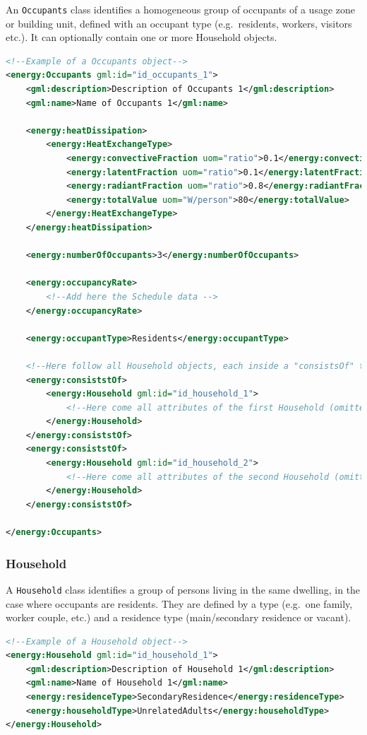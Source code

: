 \documentclass[a4paper,12pt]{article}
\begin{document}
An \lstinline!Occupants! class identifies a homogeneous group of
occupants of a usage zone or building unit, defined with an occupant
type (e.g.~residents, workers, visitors etc.). It can optionally contain
one or more Household objects.

\begin{lstlisting}[language=XML]
<!--Example of a Occupants object-->
<energy:Occupants gml:id="id_occupants_1">
    <gml:description>Description of Occupants 1</gml:description>
    <gml:name>Name of Occupants 1</gml:name>

    <energy:heatDissipation>
        <energy:HeatExchangeType>
            <energy:convectiveFraction uom="ratio">0.1</energy:convectiveFraction>
            <energy:latentFraction uom="ratio">0.1</energy:latentFraction>
            <energy:radiantFraction uom="ratio">0.8</energy:radiantFraction>
            <energy:totalValue uom="W/person">80</energy:totalValue>
        </energy:HeatExchangeType>
    </energy:heatDissipation>

    <energy:numberOfOccupants>3</energy:numberOfOccupants>

    <energy:occupancyRate>
        <!--Add here the Schedule data -->
    </energy:occupancyRate>

    <energy:occupantType>Residents</energy:occupantType>

    <!--Here follow all Household objects, each inside a "consistsOf" tag-->
    <energy:consiststOf>
        <energy:Household gml:id="id_household_1">
            <!--Here come all attributes of the first Household (omitted here)-->
        </energy:Household>
    </energy:consiststOf>
    <energy:consiststOf>
        <energy:Household gml:id="id_household_2">
            <!--Here come all attributes of the second Household (omitted here)-->
        </energy:Household>
    </energy:consiststOf>

</energy:Occupants>
\end{lstlisting}

\subsubsection{Household}\label{household}

A \lstinline!Household! class identifies a group of persons living in
the same dwelling, in the case where occupants are residents. They are
defined by a type (e.g.~one family, worker couple, etc.) and a residence
type (main/secondary residence or vacant).

\begin{lstlisting}[language=XML]
<!--Example of a Household object-->
<energy:Household gml:id="id_household_1">
    <gml:description>Description of Household 1</gml:description>
    <gml:name>Name of Household 1</gml:name>
    <energy:residenceType>SecondaryResidence</energy:residenceType>
    <energy:householdType>UnrelatedAdults</energy:householdType>
</energy:Household>
\end{lstlisting}
\end{document}
